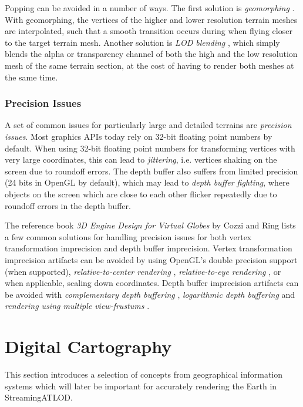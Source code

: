 Popping can be avoided in a number of ways.
The first solution is \textit{geomorphing} \cite{wikipediapopping}.
With geomorphing, the vertices of the higher and 
lower resolution terrain meshes are interpolated,
such that a smooth transition occurs during when 
flying closer to the target terrain mesh.
Another solution is \textit{LOD blending} \cite{wikipediapopping},
which simply blends the alpha or transparency channel of 
both the high and the low resolution mesh of the same 
terrain section, at the cost of having to render both meshes 
at the same time.

\subsubsection{Precision Issues}
A set of common issues for particularly large 
and detailed terrains are \textit{precision issues}.
Most graphics APIs today rely on 32-bit floating point 
numbers by default. When using 32-bit floating point 
numbers for transforming vertices with very large coordinates, this can lead to \textit{jittering},
i.e. vertices shaking on the screen due to roundoff errors.
The depth buffer also suffers from limited precision (24 bits in OpenGL by default), which may lead to 
\textit{depth buffer fighting}, where objects on the screen 
which are close to each other flicker repeatedly due to roundoff errors in the depth buffer.

The reference book \textit{3D Engine Design for Virtual Globes} by Cozzi and Ring 
lists a few common solutions for handling precision issues 
for both vertex transformation imprecision and depth buffer imprecision.
Vertex transformation imprecision artifacts can be avoided by 
using OpenGL's double precision support (when supported), 
\textit{relative-to-center rendering} \cite[p.~164]{3denginedesignforvirtualglobes}, 
\textit{relative-to-eye rendering} \cite[p.~169]{3denginedesignforvirtualglobes}, 
or when applicable, scaling down coordinates.
Depth buffer imprecision artifacts can be avoided 
with \textit{complementary depth buffering} \cite[p.~189]{3denginedesignforvirtualglobes},
\textit{logarithmic depth buffering} \cite[p.~191]{3denginedesignforvirtualglobes}
and \textit{rendering using multiple view-frustums} \cite[p.~194]{3denginedesignforvirtualglobes}.

\section{Digital Cartography}
This section introduces a selection of concepts from geographical information systems 
which will later be important for accurately rendering the Earth in StreamingATLOD.

